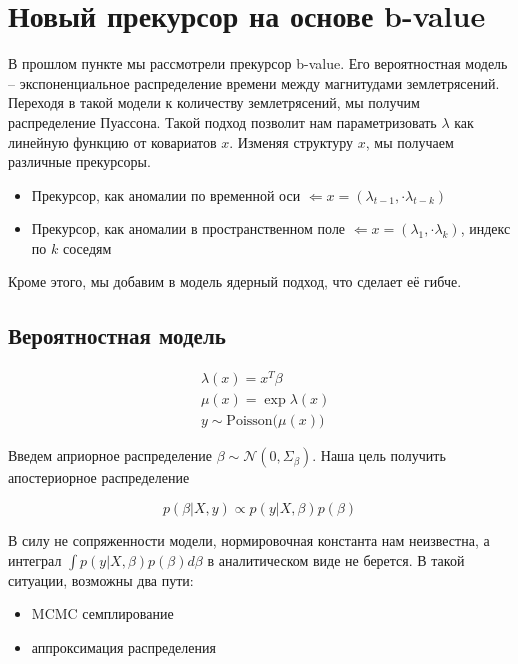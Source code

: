 \section{Новый прекурсор на основе b-value}

В прошлом пункте мы рассмотрели прекурсор b-value. Его вероятностная модель -- экспоненциальное распределение времени между магнитудами землетрясений. Переходя в такой модели к количеству землетрясений, мы получим распределение Пуассона. Такой подход позволит нам параметризовать $\lambda$ как линейную функцию от ковариатов $x$. Изменяя структуру $x$, мы получаем различные прекурсоры.

\begin{itemize}
\item Прекурсор, как аномалии по временной оси $\Leftarrow x = (\lambda_{t-1},\cdot \lambda_{t-k})$
\item Прекурсор, как аномалии в пространственном поле  $\Leftarrow x = (\lambda_{1},\cdot \lambda_{k})$,  индекс по $k$ соседям
\end{itemize}

Кроме этого, мы добавим в модель ядерный подход, что сделает её гибче.

\subsection{Вероятностная модель}

\begin{equation*}
\begin{aligned}
& \lambda(x) = x^T\beta \\
& \mu(x) = \exp{\lambda(x)} \\
& y \sim \text{Poisson($\mu(x)$)} 
\end{aligned}
\end{equation*}

Введем априорное распределение $\beta\sim\mathcal{N}(0, \Sigma_{\beta})$. Наша цель получить апостериорное распределение

$$
p(\beta|X,y)\propto p(y|X,\beta)p(\beta)
$$

В силу не сопряженности модели, нормировочная константа нам неизвестна, а интеграл $\int p(y|X,\beta)p(\beta)d\beta$ в аналитическом виде не берется. В такой ситуации, возможны два пути:
\begin{itemize}
\item MCMC семплирование 
\item аппроксимация распределения
\end{itemize}

